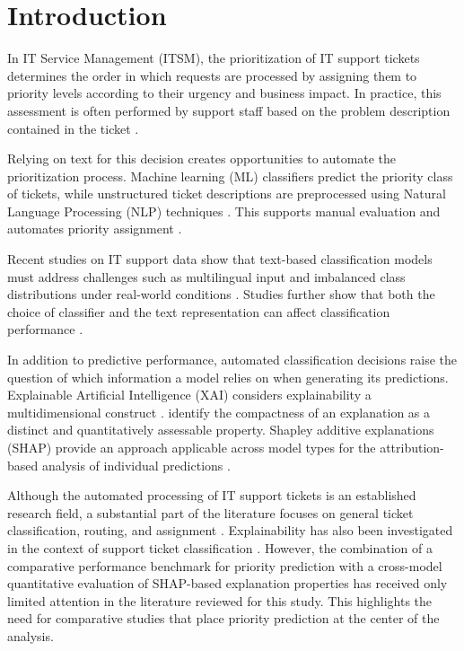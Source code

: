 \section{Introduction}

In IT Service Management (ITSM), the prioritization of IT support tickets determines the order in which requests are processed by assigning them to priority levels according to their urgency and business impact. In practice, this assessment is often performed by support staff based on the problem description contained in the ticket \cite{lyubinets2018labeling,razma2026classification}.

Relying on text for this decision creates opportunities to automate the prioritization process. Machine learning (ML) classifiers predict the priority class of tickets, while unstructured ticket descriptions are preprocessed using Natural Language Processing (NLP) techniques \cite{lyubinets2018labeling,braun-2026-solving,selvi2025customer}. This supports manual evaluation and automates priority assignment \cite{braun-2026-solving}.

Recent studies on IT support data show that text-based classification models must address challenges such as multilingual input and imbalanced class distributions under real-world conditions \cite{razma2026classification}. Studies further show that both the choice of classifier and the text representation can affect classification performance \cite{lyubinets2018labeling,revina2020ticket}.

In addition to predictive performance, automated classification decisions raise the question of which information a model relies on when generating its predictions. Explainable Artificial Intelligence (XAI) considers explainability a multidimensional construct \cite{guidotti2018survey,sokol2020factsheets}. \citet{nauta2023evaluation} identify the compactness of an explanation as a distinct and quantitatively assessable property. Shapley additive explanations (SHAP) provide an approach applicable across model types for the attribution-based analysis of individual predictions \cite{lundberg2017shap}.

Although the automated processing of IT support tickets is an established research field, a substantial part of the literature focuses on general ticket classification, routing, and assignment \cite{zangari2023ticket,fuchs2022support}. Explainability has also been investigated in the context of support ticket classification \cite{zicari2022ticket,licina2026helpagent}. However, the combination of a comparative performance benchmark for priority prediction with a cross-model quantitative evaluation of SHAP-based explanation properties has received only limited attention in the literature reviewed for this study. This highlights the need for comparative studies that place priority prediction at the center of the analysis.


